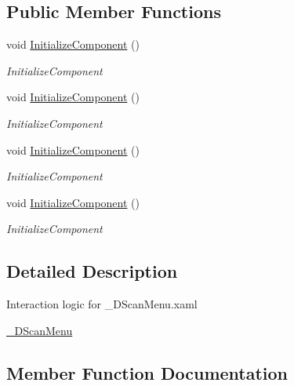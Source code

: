 \subsection*{Public Member Functions}
\begin{DoxyCompactItemize}
\item 
void \hyperlink{class_auto_sonography_w_p_f_1_1__3_d_scan_menu_a5e15f9a4094b27b93e34a8c3760db6a5}{Initialize\+Component} ()
\begin{DoxyCompactList}\small\item\em Initialize\+Component \end{DoxyCompactList}\item 
void \hyperlink{class_auto_sonography_w_p_f_1_1__3_d_scan_menu_a5e15f9a4094b27b93e34a8c3760db6a5}{Initialize\+Component} ()
\begin{DoxyCompactList}\small\item\em Initialize\+Component \end{DoxyCompactList}\item 
void \hyperlink{class_auto_sonography_w_p_f_1_1__3_d_scan_menu_a5e15f9a4094b27b93e34a8c3760db6a5}{Initialize\+Component} ()
\begin{DoxyCompactList}\small\item\em Initialize\+Component \end{DoxyCompactList}\item 
void \hyperlink{class_auto_sonography_w_p_f_1_1__3_d_scan_menu_a5e15f9a4094b27b93e34a8c3760db6a5}{Initialize\+Component} ()
\begin{DoxyCompactList}\small\item\em Initialize\+Component \end{DoxyCompactList}\end{DoxyCompactItemize}


\subsection{Detailed Description}
Interaction logic for \+\_\+D\+Scan\+Menu.\+xaml 

\hyperlink{class_auto_sonography_w_p_f_1_1__3_d_scan_menu}{\+\_\+D\+Scan\+Menu} 

\subsection{Member Function Documentation}
\hypertarget{class_auto_sonography_w_p_f_1_1__3_d_scan_menu_a5e15f9a4094b27b93e34a8c3760db6a5}{}\label{class_auto_sonography_w_p_f_1_1__3_d_scan_menu_a5e15f9a4094b27b93e34a8c3760db6a5} 
